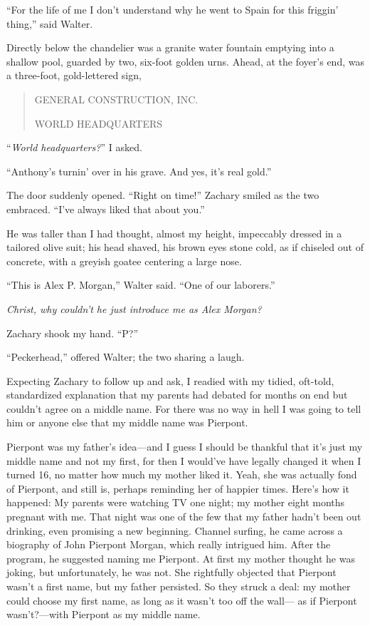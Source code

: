 ``For the life of me I don't understand why he went to Spain for this
friggin' thing,'' said Walter.

Directly below the chandelier was a granite water fountain emptying into
a shallow pool, guarded by two, six-foot golden urns. Ahead, at the
foyer's end, was a three-foot, gold-lettered sign,

\begin{quote}
GENERAL CONSTRUCTION, INC.

WORLD HEADQUARTERS
\end{quote}

\noindent ``\emph{World headquarters?}'' I asked.

``Anthony's turnin' over in his grave. And yes, it's real gold.''

The door suddenly opened. ``Right on time!'' Zachary smiled as the two
embraced. ``I've always liked that about you.''

He was taller than I had thought, almost my height, impeccably dressed
in a tailored olive suit; his head shaved, his brown eyes stone cold, as
if chiseled out of concrete, with a greyish goatee centering a large
nose.

``This is Alex P. Morgan,'' Walter said. ``One of our laborers.''

\emph{Christ, why couldn't he just introduce me as Alex Morgan?}

Zachary shook my hand. ``P?''

``Peckerhead,'' offered Walter; the two sharing a laugh.

Expecting Zachary to follow up and ask, I readied with my tidied,
oft-told, standardized explanation that my parents had debated for
months on end but couldn't agree on a middle name. For there was no way
in hell I was going to tell him or anyone else that my middle name was
Pierpont.

Pierpont was my father's idea---and I guess I should be thankful that
it's just my middle name and not my first, for then I would've have
legally changed it when I turned 16, no matter how much my mother liked
it. Yeah, she was actually fond of Pierpont, and still is, perhaps
reminding her of happier times. Here's how it happened: My parents were
watching TV one night; my mother eight months pregnant with me. That
night was one of the few that my father hadn't been out drinking, even
promising a new beginning. Channel surfing, he came across a biography
of John Pierpont Morgan, which really intrigued him. After the program,
he suggested naming me Pierpont. At first my mother thought he was
joking, but unfortunately, he was not. She rightfully objected that
Pierpont wasn't a first name, but my father persisted. So they struck a
deal: my mother could choose my first name, as long as it wasn't too off
the wall--- as if Pierpont wasn't?---with Pierpont as my middle name.

